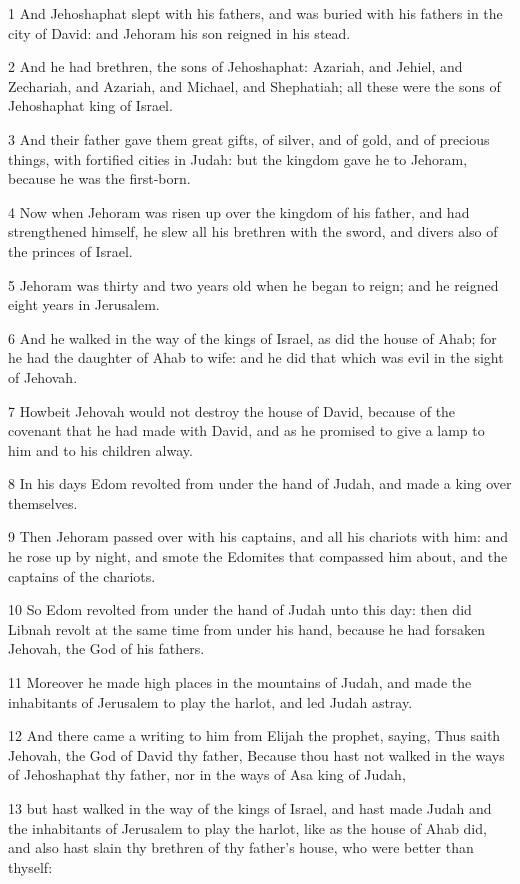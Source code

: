 \par 1 And Jehoshaphat slept with his fathers, and was buried with his fathers in the city of David: and Jehoram his son reigned in his stead.
\par 2 And he had brethren, the sons of Jehoshaphat: Azariah, and Jehiel, and Zechariah, and Azariah, and Michael, and Shephatiah; all these were the sons of Jehoshaphat king of Israel.
\par 3 And their father gave them great gifts, of silver, and of gold, and of precious things, with fortified cities in Judah: but the kingdom gave he to Jehoram, because he was the first-born.
\par 4 Now when Jehoram was risen up over the kingdom of his father, and had strengthened himself, he slew all his brethren with the sword, and divers also of the princes of Israel.
\par 5 Jehoram was thirty and two years old when he began to reign; and he reigned eight years in Jerusalem.
\par 6 And he walked in the way of the kings of Israel, as did the house of Ahab; for he had the daughter of Ahab to wife: and he did that which was evil in the sight of Jehovah.
\par 7 Howbeit Jehovah would not destroy the house of David, because of the covenant that he had made with David, and as he promised to give a lamp to him and to his children alway.
\par 8 In his days Edom revolted from under the hand of Judah, and made a king over themselves.
\par 9 Then Jehoram passed over with his captains, and all his chariots with him: and he rose up by night, and smote the Edomites that compassed him about, and the captains of the chariots.
\par 10 So Edom revolted from under the hand of Judah unto this day: then did Libnah revolt at the same time from under his hand, because he had forsaken Jehovah, the God of his fathers.
\par 11 Moreover he made high places in the mountains of Judah, and made the inhabitants of Jerusalem to play the harlot, and led Judah astray.
\par 12 And there came a writing to him from Elijah the prophet, saying, Thus saith Jehovah, the God of David thy father, Because thou hast not walked in the ways of Jehoshaphat thy father, nor in the ways of Asa king of Judah,
\par 13 but hast walked in the way of the kings of Israel, and hast made Judah and the inhabitants of Jerusalem to play the harlot, like as the house of Ahab did, and also hast slain thy brethren of thy father's house, who were better than thyself:
